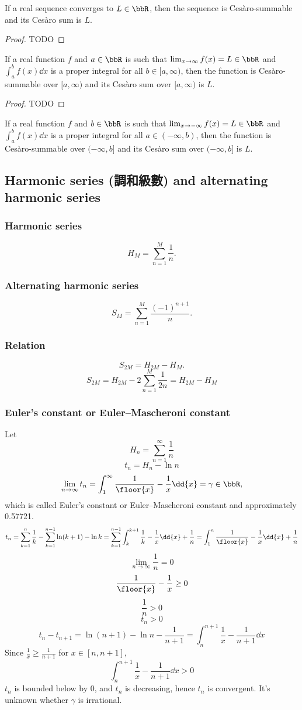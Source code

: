 If a real sequence converges to $L\in\bbR$, then the sequence is Cesàro-summable and its Cesàro sum is $L$.
\begin{proof}
TODO
\end{proof}
If a real function $f$ and $a\in\bbR$ is such that $\lim_{x\to\infty}f(x)=L\in\bbR$ and $\int_a^bf(x)\dd{x}$ is a proper integral for all $b\in[a,\infty)$, then the function is Cesàro-summable over $[a,\infty)$ and its Cesàro sum over $[a,\infty)$ is $L$.
\begin{proof}
TODO
\end{proof}
If a real function $f$ and $b\in\bbR$ is such that $\lim_{x\to-\infty}f(x)=L\in\bbR$ and $\int_a^bf(x)\dd{x}$ is a proper integral for all $a\in(-\infty,b)$, then the function is Cesàro-summable over $(-\infty,b]$ and its Cesàro sum over $(-\infty,b]$ is $L$.
\subsection{Harmonic series (調和級數) and alternating harmonic series}
\subsubsection{Harmonic series}
\[H_M=\sum_{n=1}^M\frac{1}{n}.\]
\subsubsection{Alternating harmonic series}
\[S_M=\sum_{n=1}^M\frac{(-1)^{n+1}}{n}.\]
\subsubsection{Relation}
\[S_{2M}=H_{2M}-H_M.\]
\bpr
\[S_{2M}=H_{2M}-2\sum_{n=1}^M\frac{1}{2n}=H_{2M}-H_M\]
\epr
\subsubsection{Euler's constant or Euler–Mascheroni constant}
Let
\[H_n=\sum_{n=1}^{\infty}\frac{1}{n}\]
\[t_n=H_n-\ln n\]
\[\lim_{n\to\infty}t_n=\int_1^{\infty}\frac{1}{\floor{x}}-\frac{1}{x}\dd{x}=\gamma\in\bbR,\]
which is called Euler's constant or Euler–Mascheroni constant and approximately 0.57721.
\bpr
\[t_n=\sum_{k=1}^n\frac{1}{k}-\sum_{k=1}^{n-1}\ln(k+1)-\ln k=\sum_{k=1}^{n-1}\int_k^{k+1}\frac{1}{k}-\frac{1}{x}\dd{x}+\frac{1}{n}=\int_1^n\frac{1}{\floor{x}}-\frac{1}{x}\dd{x}+\frac{1}{n}\]
\[\lim_{n\to\infty}\frac{1}{n}=0\]
\[\frac{1}{\floor{x}}-\frac{1}{x}\ge0\]
\[\frac{1}{n}>0\]
\[t_n>0\]
\[t_n-t_{n+1}=\ln(n+1)-\ln n-\frac{1}{n+1}=\int_n^{n+1}\frac{1}{x}-\frac{1}{n+1}\dd{x}\]
Since $\frac{1}{x}\ge\frac{1}{n+1}$ for $x\in[n,n+1]$,
\[\int_n^{n+1}\frac{1}{x}-\frac{1}{n+1}\dd{x}>0\]
$t_n$ is bounded below by 0, and $t_n$ is decreasing, hence $t_n$ is convergent.
\epr
It's unknown whether $\gamma$ is irrational.
